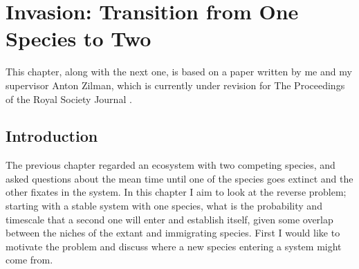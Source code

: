 \chapter{Invasion: Transition from One Species to Two}



This chapter, along with the next one, is based on a paper written by me and my supervisor Anton Zilman, which is currently under revision for The Proceedings of the Royal Society Journal \cite{Badali2019a}. 



\section{Introduction}
The previous chapter regarded an ecosystem with two competing species, and asked questions about the mean time until one of the species goes extinct and the other fixates in the system. 
In this chapter I aim to look at the reverse problem; starting with a stable system with one species, what is the probability and timescale that a second one will enter and establish itself, given some overlap between the niches of the extant and immigrating species. 
First I would like to motivate the problem and discuss where a new species entering a system might come from. 

